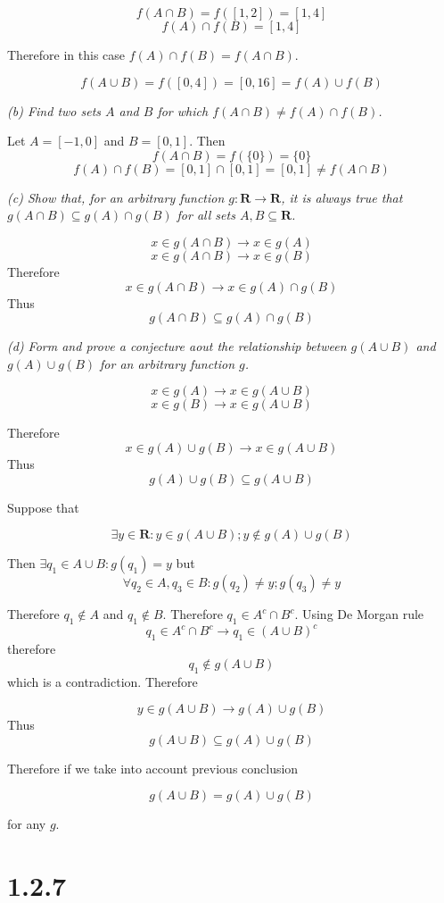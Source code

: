 \documentclass[11pt,oneside,titlepage]{article}
\begin{document}
$$f(A \cap B) = f([1, 2]) = [1, 4]$$
$$f(A) \cap f(B) = [1, 4]$$

Therefore in this case $f(A) \cap f(B) = f(A \cap B)$.

$$f(A \cup B) = f([0, 4]) = [0, 16] = f(A) \cup f(B)$$

\textit{(b) Find two sets $A$ and $B$ for which $f(A \cap B) \neq f(A) \cap f(B)$.}

Let $A = [-1, 0]$ and $B = [0, 1]$. Then
$$f(A \cap B) = f(\{0\}) = \{0\}$$
$$f(A) \cap f(B) = [0, 1] \cap [0, 1] = [0, 1] \neq f(A \cap B)$$

\textit{(c) Show that, for an arbitrary function $g: \textbf{R} \to \textbf{R}$, it
  is always true that $g(A \cap B) \subseteq g(A) \cap g(B)$ for all sets
  $A,B \subseteq \textbf{R}$.}

$$x \in g(A \cap B) \to x \in g(A)$$
$$x \in g(A \cap B) \to x \in g(B)$$
Therefore
$$x \in g(A \cap B) \to x \in g(A) \cap g(B)$$
Thus
$$g(A \cap B) \subseteq g(A) \cap g(B)$$

\textit{(d) Form and prove a conjecture aout the relationship between $g(A \cup B)$ and $g(A) \cup g(B)$ for an arbitrary function $g$.}

$$x \in g(A) \to x \in g(A \cup B)$$
$$x \in g(B) \to x \in g(A \cup B)$$

Therefore
$$x \in g(A) \cup g(B) \to x \in g(A \cup B)$$
Thus
$$g(A) \cup g(B) \subseteq g(A \cup B)$$

Suppose that

$$\exists y \in \textbf{R}: y \in g(A \cup B); y \notin g(A) \cup g(B)$$

Then $\exists q_1 \in A \cup B: g(q_1) = y$ but
$$\forall q_2 \in A, q_3 \in B: g(q_2) \neq y; g(q_3) \neq y$$

Therefore $q_1 \notin A$ and $q_1 \notin B$. Therefore $q_1 \in A^c \cap B^c$.
Using De Morgan rule
$$q_1 \in A^c \cap B^c \to q_1 \in (A \cup B)^c$$
therefore 
$$q_1 \notin g(A \cup B)$$
which is a contradiction. Therefore

$$y \in g(A \cup B) \to g(A) \cup g(B)$$
Thus
$$g(A \cup B) \subseteq g(A) \cup g(B)$$

Therefore if we take into account previous conclusion

$$g(A \cup B) = g(A) \cup g(B)$$

for any $g$.

\section*{1.2.7}
\end{document}
